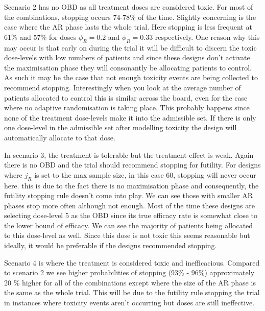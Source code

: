 Scenario 2 has no OBD as all treatment doses are considered toxic. For most of the combinations, stopping occurs 74-78\% of the time. Slightly concerning is the case where the AR phase lasts the whole trial. Here stopping is less frequent at 61\% and 57\% for doses $\phi_R = 0.2$ and $\phi_R = 0.33$ respectively. One reason why this may occur is that early on during the trial it will be difficult to discern the toxic dose-levels with low numbers of patients and since these designs don't activate the maximisation phase they will consonantly be allocating patients to control. As such it may be the case that not enough toxicity events are being collected to recommend stopping. Interestingly when you look at the average number of patients allocated to control this is similar across the board, even for the case where no adaptive randomisation is taking place. This probably happens since none of the treatment dose-levels make it into the admissible set. If there is only one dose-level in the admissible set after modelling toxicity the design will automatically allocate to that dose.  

In scenario 3, the treatment is tolerable but the treatment effect is weak. Again there is no OBD and the trial should recommend stopping for futility. For designs where $j_R$ is set to the max sample size, in this case 60, stopping will never occur here. this is due to the fact there is no maximisation phase and consequently, the futility stopping rule doesn't come into play. We can see those with smaller AR phases stop more often although not enough. Most of the time these designs are selecting dose-level 5 as the OBD since its true efficacy rate is somewhat close to the lower bound of efficacy. We can see the majority of patients being allocated to this dose-level as well. Since this dose is not toxic this seems reasonable but ideally, it would be preferable if the designs recommended stopping. 

Scenario 4 is where the treatment is considered toxic and inefficacious. Compared to scenario 2 we see higher probabilities  of stopping (93\% - 96\%) approximately 20 \% higher for all of the combinations except where the size of the AR phase is the same as the whole trial. This will be due to the futility rule stopping the trial in instances where toxicity events aren't occurring but doses are still ineffective. 

